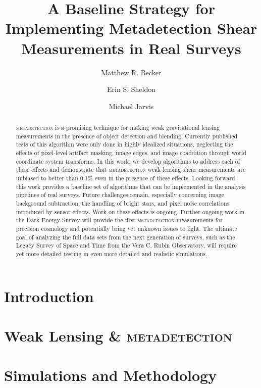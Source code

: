 \documentclass[twocolappendix, appendixfloats, numberedappendix, twocolumn, apj]{openjournal}
\newcommand{\mdet}{\textsc{metadetection}\xspace}
\begin{document}
\title{A Baseline Strategy for Implementing Metadetection Shear Measurements in Real Surveys}

\author{Matthew R. Becker}
\author{Erin S. Sheldon}
\author{Michael Jarvis}


\begin{abstract}
\mdet is a promising technique for making weak gravitational lensing measurements in the presence of
object detection and blending. Currently published tests of this algorithm were only done in
highly idealized situations, neglecting the effects of pixel-level artifact masking, image edges,
and image coaddition through world coordinate system transforms. In this work, we develop algorithms
to address each of these effects and demonstrate that \mdet weak lensing shear measurements are
unbiased to better than 0.1\% even in the presence of these effects. Looking forward, this work provides
a baseline set of algorithms that can be implemented in the analysis pipelines of real surveys.
Future challenges remain, especially concerning image background subtraction, the handling of bright stars, and
pixel noise correlations introduced by sensor effects. Work on these effects is ongoing. Further
ongoing work in the Dark Energy Survey will provide the first \mdet measurements for precision
cosmology and potentially bring yet unknown issues to light. The ultimate goal of analyzing the
full data sets from the next generation of surveys, such as the Legacy Survey of Space and Time
from the Vera C. Rubin Observatory, will require yet more detailed testing in even more detailed
and realistic simulations.
\end{abstract}


\section{Introduction}\label{sec:intro}

\section{Weak Lensing \& \mdet}\label{sec:background}

\section{Simulations and Methodology}\label{sec:sims}
\end{document}

